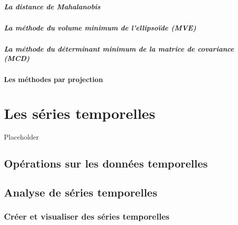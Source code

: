 \documentclass[]{book}
\let\oldparagraph\paragraph
\renewcommand{\paragraph}[1]{\oldparagraph{#1}\mbox{}}
\begin{document}
\hypertarget{la-distance-de-mahalanobis}{%
\paragraph{La distance de
Mahalanobis}\label{la-distance-de-mahalanobis}}

\hypertarget{la-muxe9thode-du-volume-minimum-de-lellipsouxefde-mve}{%
\paragraph{La méthode du volume minimum de l'ellipsoïde
(MVE)}\label{la-muxe9thode-du-volume-minimum-de-lellipsouxefde-mve}}

\hypertarget{la-muxe9thode-du-duxe9terminant-minimum-de-la-matrice-de-covariance-mcd}{%
\paragraph{La méthode du déterminant minimum de la matrice de covariance
(MCD)}\label{la-muxe9thode-du-duxe9terminant-minimum-de-la-matrice-de-covariance-mcd}}

\hypertarget{les-muxe9thodes-par-projection}{%
\subsubsection{Les méthodes par
projection}\label{les-muxe9thodes-par-projection}}

\hypertarget{chapitre-temps}{%
\chapter{Les séries temporelles}\label{chapitre-temps}}

Placeholder

\hypertarget{opuxe9rations-sur-les-donnuxe9es-temporelles}{%
\section{Opérations sur les données
temporelles}\label{opuxe9rations-sur-les-donnuxe9es-temporelles}}

\hypertarget{analyse-de-suxe9ries-temporelles}{%
\section{Analyse de séries
temporelles}\label{analyse-de-suxe9ries-temporelles}}

\hypertarget{cruxe9er-et-visualiser-des-suxe9ries-temporelles}{%
\subsection{Créer et visualiser des séries
temporelles}\label{cruxe9er-et-visualiser-des-suxe9ries-temporelles}}
\end{document}
